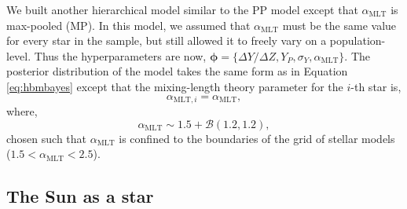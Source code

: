 \documentclass[a4paper,fleqn,usenatbib]{mnras}
\newcommand{\mlt}{\ensuremath{{\alpha_\mathrm{MLT}}}}
\begin{document}
We built another hierarchical model similar to the PP model except that $\mlt$ is max-pooled (MP). In this model, we assumed that $\mlt$ must be the same value for every star in the sample, but still allowed it to freely vary on a population-level. Thus the hyperparameters are now, $\boldsymbol{\phi} = \{\Delta Y/\Delta Z, Y_P, \sigma_Y, \mlt\}$. The posterior distribution of the model takes the same form as in Equation \ref{eq:hbmbayes} except that the mixing-length theory parameter for the $i$-th star is,
%
\begin{equation}
    \alpha_{\mathrm{MLT}, i} = \mlt,
\end{equation}
%
where,
\begin{equation}
    \mlt \sim 1.5 + \mathcal{B}(1.2, 1.2),
\end{equation}
chosen such that $\mlt$ is confined to the boundaries of the grid of stellar models ($1.5 < \mlt < 2.5$).

\subsection{The Sun as a star}\label{sec:sun}

\end{document}
